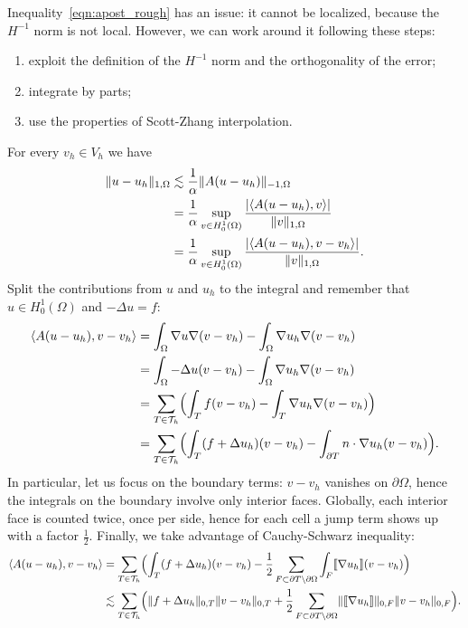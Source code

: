 Inequality~\eqref{eqn:apost_rough} has an issue: it cannot be localized, because the $H^{-1}$ norm is not local. However, we can work around it following these steps:
\begin{enumerate}
    \item exploit the definition of the $H^{-1}$ norm and the orthogonality of the error;
    \item integrate by parts;
    \item use the properties of Scott-Zhang interpolation.
\end{enumerate}
 For every $v_h \in V_h$ we have
\begin{align}
    \lVert u-u_h\rVert_{1,\Omega} &\lesssim \frac{1}{\alpha} \lVert A(u-u_h)\rVert_{-1,\Omega} \\
    &= \frac{1}{\alpha} \sup_{v \in H^1_0(\Omega)} \frac{\lvert\langle A(u-u_h),v \rangle\rvert}{\lVert v\rVert_{1,\Omega}} \\
    &= \frac{1}{\alpha} \sup_{v \in H^1_0(\Omega)} \frac{\lvert\langle A(u-u_h),v-v_h \rangle\rvert}{\lVert v\rVert_{1,\Omega}}.
\end{align}
 Split the contributions from $u$ and $u_h$ to the integral and remember that $u\in H^1_0(\Omega)$ and $-\Delta u = f$:
\begin{align}
    \langle A(u-u_h),v-v_h \rangle &= \int_\Omega \nabla u \nabla(v-v_h) - \int_\Omega \nabla u_h \nabla(v-v_h) \\
    & = \int_\Omega -\Delta u (v-v_h) - \int_\Omega \nabla u_h \nabla(v-v_h) \\
    & = \sum_{T \in \mathcal{T}_h} \Bigl(\int_T f (v-v_h) - \int_T \nabla u_h \nabla(v-v_h) \Bigr) \\
    & = \sum_{T \in \mathcal{T}_h} \Bigl(\int_T (f + \Delta u_h) (v-v_h) - \int_{\partial T} n \cdot \nabla u_h (v-v_h) \Bigr).
\end{align}
In particular, let us focus on the boundary terms: $v-v_h$ vanishes on $\partial\Omega$, hence the integrals on the boundary involve only interior faces. Globally, each interior face is counted twice, once per side, hence for each cell a jump term shows up with a factor $\frac{1}{2}$. Finally, we take advantage of Cauchy-Schwarz inequality:
\begin{align}
    \langle A(u-u_h),v-v_h \rangle &=
    \sum_{T \in \mathcal{T}_h} \Bigl(\int_T (f + \Delta u_h) (v-v_h) -
    \frac{1}{2} \sum_{F \subset \partial T\setminus\partial\Omega} \int_{F} \llbracket\nabla u_h\rrbracket (v-v_h) \Bigr) \\
    &\lesssim \sum_{T \in \mathcal{T}_h} \Bigl( \lVert f + \Delta u_h\rVert_{0,T} \lVert v-v_h\rVert_{0,T} +
    \frac{1}{2} \sum_{F \subset \partial T\setminus\partial\Omega} \lVert\llbracket\nabla u_h\rrbracket\rVert_{0,F} \lVert v-v_h\rVert_{0,F} \Bigr).
\end{align}
